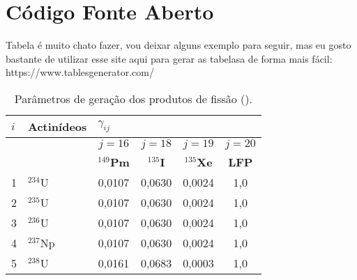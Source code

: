 \chapter{Código Fonte Aberto}
\label{apendice}

Tabela é muito chato fazer, vou deixar alguns exemplo para seguir, mas eu gosto bastante de utilizar esse site aqui para gerar as tabelasa de forma mais fácil: https://www.tablesgenerator.com/


\begin{table}[H]
\centering
\caption{Parâmetros de geração dos produtos de fissão (\cite{belo2022}).} \label{tab:generationPF} \vspace{0.5cm}
\begin{tabular}{llcccc}
\hline
\textbf{$i$} & \textbf{Actinídeos} & \multicolumn{1}{l}{\textbf{$\gamma_{ij}$}} & \multicolumn{1}{l}{\textbf{}} & \multicolumn{1}{l}{\textbf{}} & \multicolumn{1}{l}{\textbf{}} \\ \hline
\textbf{}    & \textbf{}           & \textbf{$j = 16$}                          & \textbf{$j = 18$}             & \textbf{$j = 19$}             & \textbf{$j = 20$}             \\
\textbf{}    & \textbf{}           & \textbf{$^{149}$Pm}                      & \textbf{$^{135}$I}          & \textbf{$^{135}$Xe}         & \textbf{LFP}                \\ \hline
1            & $^{234}$U           & 0,0107                                     & 0,0630                        & 0,0024                        & 1,0                           \\
2            & $^{235}$U           & 0,0107                                     & 0,0630                        & 0,0024                        & 1,0                           \\
3            & $^{236}$U           & 0,0107                                     & 0,0630                        & 0,0024                        & 1,0                           \\
4            & $^{237}$Np          & 0,0107                                     & 0,0630                        & 0,0024                        & 1,0                           \\
5            & $^{238}$U           & 0,0161                                     & 0,0683                        & 0,0003                        & 1,0                           \\

\end{tabular}
\end{table}
